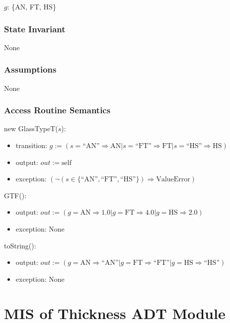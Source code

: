 \documentclass[12pt, titlepage]{article}
\begin{document}
$g$: \{AN, FT, HS\}

\subsubsection {State Invariant}

None

\subsubsection {Assumptions}

None

\subsubsection {Access Routine Semantics}

\noindent new GlassTypeT($s$):
\begin{itemize}
\item transition: $g := (s = \mbox{``AN''} \Rightarrow \mbox{AN} | s =
  \mbox{``FT''} \Rightarrow \mbox{FT} | s = \mbox{``HS''} \Rightarrow \mbox{HS})$
\item output: $out := \mbox{self}$
\item exception: $(\neg (s \in \{ \mbox{``AN''}, \mbox{``FT''}, \mbox{``HS''} \}) \Rightarrow \mbox{ValueError})$
\end{itemize}

\noindent GTF():
\begin{itemize}
\item output: $out := ( g = \mbox{AN} \Rightarrow 1.0 | g =
  \mbox{FT} \Rightarrow 4.0 | g = \mbox{HS} \Rightarrow 2.0)$
\item exception: None
\end{itemize}

\noindent toString():
\begin{itemize}
\item output: $out := (g = \mbox{AN} \Rightarrow \mbox{``AN''} | g =
  \mbox{FT} \Rightarrow \mbox{``FT''} | g = \mbox{HS} \Rightarrow \mbox{``HS''})$
\item exception: None
\end{itemize}

\newpage


\section {MIS of Thickness ADT Module} \label{ThicknessADT}
\end{document}
